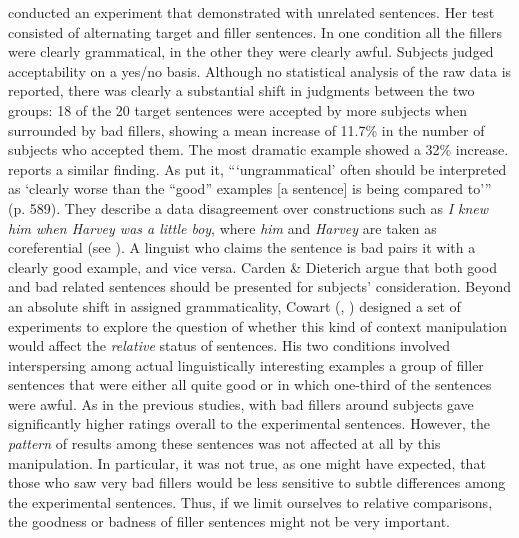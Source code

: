 \citet{Snow1975} conducted an experiment that demonstrated  with unrelated sentences. Her test consisted of alternating target and filler sentences. In one condition all the fillers were clearly grammatical, in the other they were clearly awful. Subjects judged acceptability on a yes/no basis. Although no statistical analysis of the raw data is reported, there was clearly a substantial shift in judgments between the two groups: 18 of the 20 target sentences were accepted by more subjects when surrounded by bad fillers, showing a mean increase of 11.7\% in the number of subjects who accepted them. The most dramatic example showed a 32\% increase. \citet{Nagata1992} reports a similar finding. As \citet{CardenEtAl1981} put it, ```ungrammatical' often should be interpreted as `clearly worse than the ``good'' examples [a sentence] is being compared to'” (p. 589).
They describe a data disagreement over  constructions such as \textit{I knew him when Harvey was a little boy}, where \textit{him} and \textit{Harvey} are taken as coreferential (see ). A linguist who claims the sentence is bad pairs it with a clearly good example, and vice versa. Carden \& Dieterich argue that both good and bad related sentences should be presented for subjects' consideration. Beyond an absolute shift in assigned grammaticality, Cowart (\citeyear{Cowart1994}, \citeyear[22--27]{Cowart1997}) designed a
set of experiments to explore the question of whether this kind of context manipulation would affect the \textit{relative} status of sentences. His two conditions involved interspersing among actual linguistically interesting examples a group of
filler sentences that were either all quite good or in which one-third of the sentences were awful. As in the previous studies, with bad fillers around subjects gave significantly higher ratings overall to the experimental sentences. However, the \textit{pattern} of results among these sentences was not affected at all by this manipulation. In particular, it was not true, as one might have expected, that those who saw very bad fillers would be less sensitive to subtle differences among the experimental sentences. Thus, if we limit ourselves to relative comparisons, the goodness or badness of filler sentences might not be very important.

